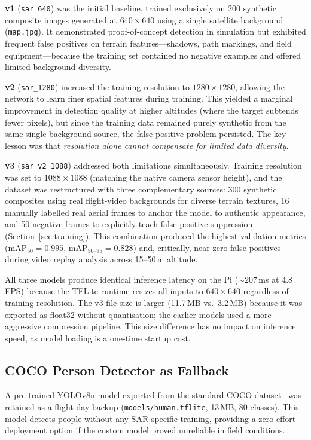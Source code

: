 \textbf{v1} (\texttt{sar\_640}) was the initial baseline, trained exclusively on 200 synthetic composite images generated at $640\times640$ using a single satellite background (\texttt{map.jpg}).  It demonstrated proof-of-concept detection in simulation but exhibited frequent false positives on terrain features---shadows, path markings, and field equipment---because the training set contained no negative examples and offered limited background diversity.

\textbf{v2} (\texttt{sar\_1280}) increased the training resolution to $1280\times1280$, allowing the network to learn finer spatial features during training.  This yielded a marginal improvement in detection quality at higher altitudes (where the target subtends fewer pixels), but since the training data remained purely synthetic from the same single background source, the false-positive problem persisted.  The key lesson was that \emph{resolution alone cannot compensate for limited data diversity}.

\textbf{v3} (\texttt{sar\_v2\_1088}) addressed both limitations simultaneously.  Training resolution was set to $1088\times1088$ (matching the native camera sensor height), and the dataset was restructured with three complementary sources: 300 synthetic composites using real flight-video backgrounds for diverse terrain textures, 16 manually labelled real aerial frames to anchor the model to authentic appearance, and 50 negative frames to explicitly teach false-positive suppression (Section~\ref{sec:training}).  This combination produced the highest validation metrics (mAP$_{50}=0.995$, mAP$_{50\text{--}95}=0.828$) and, critically, near-zero false positives during video replay analysis across 15--50\,m altitude.

All three models produce identical inference latency on the Pi (${\sim}207$\,ms at 4.8\,FPS) because the TFLite runtime resizes all inputs to $640\times640$ regardless of training resolution.  The v3 file size is larger (11.7\,MB vs.\ 3.2\,MB) because it was exported as float32 without quantisation; the earlier models used a more aggressive compression pipeline.  This size difference has no impact on inference speed, as model loading is a one-time startup cost.

\subsection{COCO Person Detector as Fallback}\label{sec:model_comparison:coco}

A pre-trained YOLOv8n model exported from the standard COCO dataset~\cite{lin2014coco} was retained as a flight-day backup (\texttt{models/human.tflite}, 13\,MB, 80 classes).  This model detects people without any SAR-specific training, providing a zero-effort deployment option if the custom model proved unreliable in field conditions.

